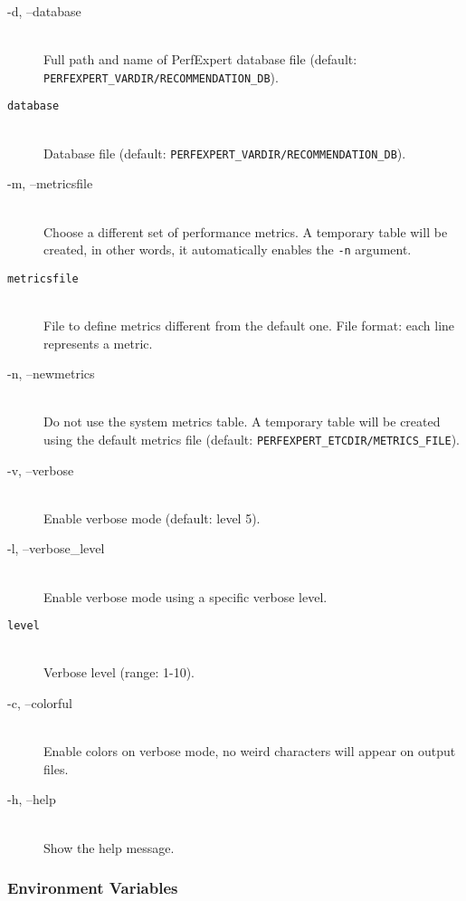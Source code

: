 \begin{description}
	\item[\btt -d, --database]\hfill \\
	Full path and name of PerfExpert database file (default: \texttt{PERFEXPERT\_VARDIR/RECOMMENDATION\_DB}).

	\item[\tt database]\hfill \\
	Database file (default: \texttt{PERFEXPERT\_VARDIR/RECOMMENDATION\_DB}).

	\item[\btt -m, --metricsfile]\hfill \\
	Choose a different set of performance metrics. A temporary table will be created, in other words, it automatically enables the \texttt{-n} argument.

	\item[\tt metricsfile]\hfill \\
	File to define metrics different from the default one. File format: each line represents a metric.

	\item[\btt -n, --newmetrics]\hfill \\
	Do not use the system metrics table. A temporary table will be created using the default metrics file (default: \texttt{PERFEXPERT\_ETCDIR/METRICS\_FILE}).

	\item[\btt -v, --verbose]\hfill \\
	Enable verbose mode (default: level 5).

	\item[\btt -l, --verbose\_level]\hfill \\
	Enable verbose mode using a specific verbose level.

	\item[\tt level]\hfill \\
	Verbose level (range: 1-10).

	\item[\btt -c, --colorful]\hfill \\
	Enable colors on verbose mode, no weird characters will appear on output files.

	\item[\btt -h, --help]\hfill \\
	Show the help message.
\end{description}

\subsubsection{Environment Variables}

